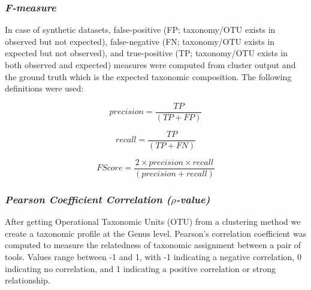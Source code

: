 \documentclass[10pt, conference, compsocconf]{IEEEtran}
\begin{document}
\subsubsection{\textit{F-measure}}
In case of synthetic datasets, false-positive (FP; taxonomy/OTU exists in observed but not expected), false-negative
(FN; taxonomy/OTU exists in expected but not observed), and 
true-positive (TP; taxonomy/OTU exists in both observed and expected) measures were computed from 
cluster output and the ground truth which is the expected taxonomic composition. The following definitions were used:

\begin{equation}
precision = \frac{TP}{(TP + FP)}
\end{equation}

\begin{equation}
recall = \frac{TP}{(TP + FN)}
\end{equation}

\begin{equation}
F Score = \frac{2 \times precision \times recall}{(precision + recall)}
\end{equation}

\subsubsection{\textit{Pearson Coefficient Correlation ($\rho$-value)}}
After getting Operational Taxonomic Units (OTU) from a clustering method we create a taxonomic profile at the Genus level. Pearson’s correlation coefficient was computed to measure the relatedness of taxonomic assignment between a pair of tools. Values range between -1 and 1, with -1 indicating a negative correlation, 0 indicating no correlation, and 1 indicating a positive correlation or strong relationship.
\end{document}
